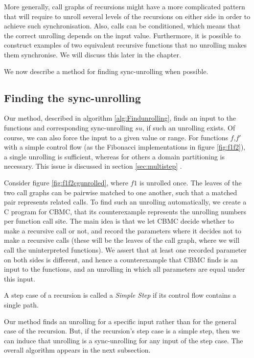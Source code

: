More generally, call graphs of recursions might have a more complicated pattern that will require to unroll several levels of the recursions on either side in order to achieve such synchronisation. Also, calls can be conditioned, which means that the correct unrolling depends on the input value. Furthermore, it is possible to construct examples of two equivalent recursive functions that no unrolling makes them synchronise. We will discuss this later in the chapter. 

We now describe a method for finding sync-unrolling when possible.

\subsection{Finding the sync-unrolling}
Our method, described in algorithm \ref{alg:Findunrolling}, finds an input to the functions and corresponding sync-unrolling $su$, if such an unrolling exists. Of course, we can also force the input to a given value or range. For functions $f$,$f'$ with a simple control flow (as the Fibonacci implementations in figure \ref{fig:f1f2}), a single unrolling is sufficient, whereas for others a domain partitioning is necessary. This issue is discussed in section \ref{sec:multistep} . 

Consider figure \ref{fig:f1f2cgunrolled}, where $f1$ is unrolled once. The leaves of the two call graphs can be pairwise matched to one another, such that a matched pair represents related calls. To find such an unrolling automatically, we create a C program for CBMC, that its counterexample represents the unrolling numbers per function call site. The main idea is that we let CBMC decide whether to make a recursive call or not, and record the parameters where it decides not to make a recursive calls (these will be the leaves of the call graph, where we will call the uninterpreted functions). We assert that at least one recorded parameter on both sides is different, and hence a counterexample that CBMC finds is an input to the functions, and an unrolling in which all parameters are equal under this input. 
  
\begin{definition}
A step case of a recursion is called a \emph{Simple Step} if its control flow contains a single path.
\end{definition}
Our method finds an unrolling for a specific input rather than for the general case of the recursion. But, if the recursion's step case is a simple step, then we can induce that unrolling is a sync-unrolling for any input of the step case.
The overall algorithm appears in the next subsection. 

